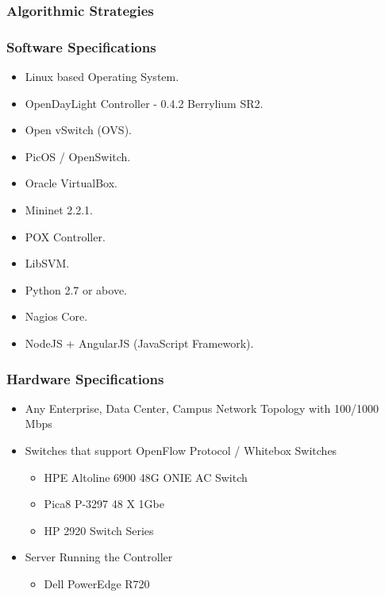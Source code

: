 \documentclass[10pt]{beamer}
\begin{document}
\begin{frame}
\frametitle{Algorithmic Strategies}
\end{frame}

	

\begin{frame}
\frametitle{Software Specifications}
\begin{itemize}
\footnotesize
\item
Linux based Operating System.
\item
OpenDayLight Controller - 0.4.2 Berrylium SR2.
\item
Open vSwitch (OVS).
\item
PicOS / OpenSwitch.
\item
Oracle VirtualBox.
\item
Mininet 2.2.1.
\item
POX Controller.
\item
LibSVM.
\item
Python 2.7 or above.
\item
Nagios Core.
\item
NodeJS + AngularJS (JavaScript Framework). 
\end{itemize}
\end{frame}

\begin{frame}
\frametitle{Hardware Specifications}
\begin{itemize}
\footnotesize
\item
Any Enterprise, Data Center, Campus Network Topology with 100/1000 Mbps
\item
Switches that support OpenFlow Protocol / Whitebox Switches
\begin{itemize}
\item
HPE Altoline 6900 48G ONIE AC Switch
\item
Pica8 P-3297 48 X 1Gbe
\item
HP 2920 Switch Series
\end{itemize}

\item
Server Running the Controller
\begin{itemize}
\item
Dell PowerEdge R720
\end{itemize}

\end{itemize}
\end{frame}
\end{document}
